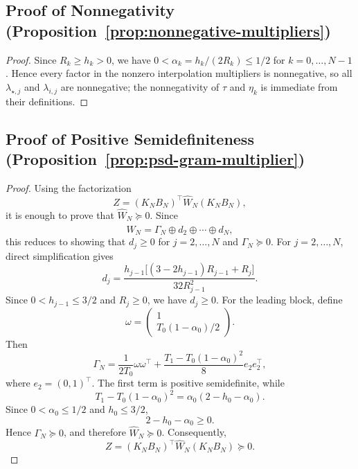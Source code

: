 \subsection{Proof of Nonnegativity (Proposition~\ref{prop:nonnegative-multipliers})}
\begin{proof}
Since $R_k\ge h_k>0$, we have $0<\alpha_k=h_k/(2R_k)\le1/2$ for $k=0,\ldots,N-1$. Hence every factor in the nonzero interpolation multipliers is nonnegative, so all $\lambda_{\star,j}$ and $\lambda_{i,j}$ are nonnegative; the nonnegativity of $\tau$ and $\eta_k$ is immediate from their definitions.
\end{proof}

\subsection{Proof of Positive Semidefiniteness (Proposition~\ref{prop:psd-gram-multiplier})}
\begin{proof}
Using the factorization
\[Z=(K_NB_N)^\top\widehat W_N(K_NB_N),\]
it is enough to prove that $\widehat W_N\succeq0$. Since
\[\widehat W_N=\Gamma_N\oplus d_2\oplus\cdots\oplus d_N,\]
this reduces to showing that $d_j\ge0$ for $j=2,\ldots,N$ and
$\Gamma_N\succeq0$.
For $j=2,\ldots,N$, direct simplification gives
\[d_j= \frac{h_{j-1}\big[(3-2h_{j-1})R_{j-1}+R_j\big]} {32R_{j-1}^2}. \]
Since $0<h_{j-1}\le3/2$ and $R_j\ge0$, we have $d_j\ge0$.
For the leading block, define
\[ \omega=
\begin{pmatrix} 1
\\ T_0(1-\alpha_0)/2 
\end{pmatrix}. \]
Then
\[ \Gamma_N =
\frac{1}{2T_0}\omega\omega^\top + \frac{T_1-T_0(1-\alpha_0)^2}{8}e_2e_2^\top, \]
where $e_2=(0,1)^\top$.
The first term is positive semidefinite, while
\[ T_1-T_0(1-\alpha_0)^2 = \alpha_0(2-h_0-\alpha_0). \]
Since $0<\alpha_0\le1/2$ and $h_0\le3/2$,
\[ 2-h_0-\alpha_0\ge0. \]
Hence $\Gamma_N\succeq0$, and therefore $\widehat W_N\succeq0$.
Consequently,
\[ Z=(K_NB_N)^\top\widehat W_N(K_NB_N)\succeq0. \]
\end{proof}
